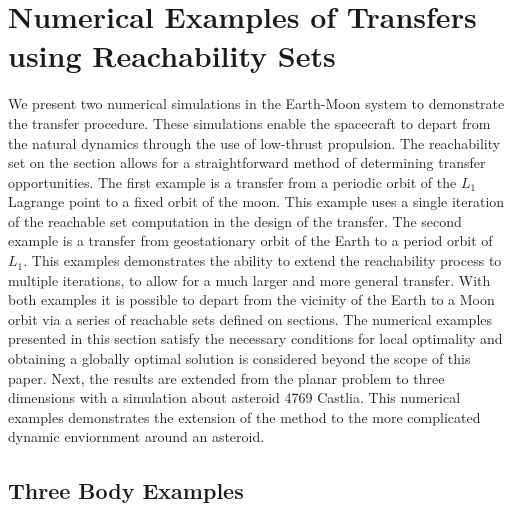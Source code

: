 \section{Numerical Examples of Transfers using Reachability Sets}\label{sec:simulation}
We present two numerical simulations in the Earth-Moon system to demonstrate the transfer procedure.
These simulations enable the spacecraft to depart from the natural dynamics through the use of low-thrust propulsion.
The reachability set on the \Poincare section allows for a straightforward method of determining transfer opportunities.
The first example is a transfer from a periodic orbit of the \( L_1 \) Lagrange point to a fixed orbit of the moon.
This example uses a single iteration of the reachable set computation in the design of the transfer.
The second example is a transfer from geostationary orbit of the Earth to a period orbit of \( L_1 \). 
This examples demonstrates the ability to extend the reachability process to multiple iterations, to allow for a much larger and more general transfer.
With both examples it is possible to depart from the vicinity of the Earth to a Moon orbit via a series of reachable sets defined on \Poincare sections.
The numerical examples presented in this section satisfy the necessary conditions for local optimality and obtaining a globally optimal solution is considered beyond the scope of this paper.
Next, the results are extended from the planar problem to three dimensions with a simulation about asteroid 4769 Castlia.
This numerical examples demonstrates the extension of the method to the more complicated dynamic enviornment around an asteroid.

\subsection{Three Body Examples}


